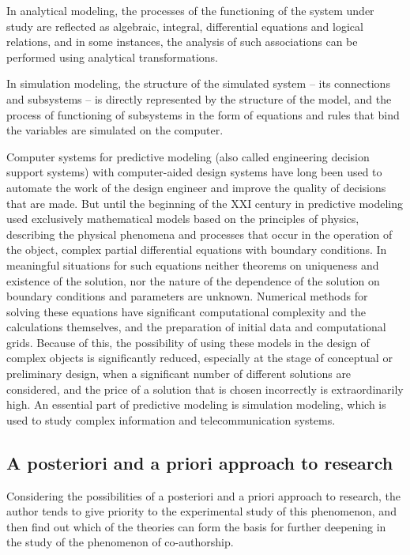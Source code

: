 \documentclass[12pt]{report}
\theoremstyle{definition}
\begin{document}
In analytical modeling, the processes of the functioning of the system under study are reflected as algebraic, integral, differential equations and logical relations, and in some instances, the analysis of such associations can be performed using analytical transformations.

In simulation modeling, the structure of the simulated system -- its connections and subsystems -- is directly represented by the structure of the model, and the process of functioning of subsystems in the form of equations and rules that bind the variables are simulated on the computer.

Computer systems for predictive modeling (also called engineering decision support systems) with computer-aided design systems have long been used to automate the work of the design engineer and improve the quality of decisions that are made. 
But until the beginning of the XXI century in predictive modeling used exclusively mathematical models based on the principles of physics, describing the physical phenomena and processes that occur in the operation of the object, complex partial differential equations with boundary conditions. 
In meaningful situations for such equations neither theorems on uniqueness and existence of the solution, nor the nature of the dependence of the solution on boundary conditions and parameters are unknown.
Numerical methods for solving these equations have significant computational complexity and the calculations themselves, and the preparation of initial data and computational grids.
Because of this, the possibility of using these models in the design of complex objects is significantly reduced, especially at the stage of conceptual or preliminary design, when a significant number of different solutions are considered, and the price of a solution that is chosen incorrectly is extraordinarily high. 
An essential part of predictive modeling is simulation modeling, which is used to study complex information and telecommunication systems.

\subsection{A posteriori and a priori approach to research}
Considering the possibilities of a posteriori and a priori approach to research, the author tends to give priority to the experimental study of this phenomenon, and then find out which of the theories can form the basis for further deepening in the study of the phenomenon of co-authorship.
\end{document}
